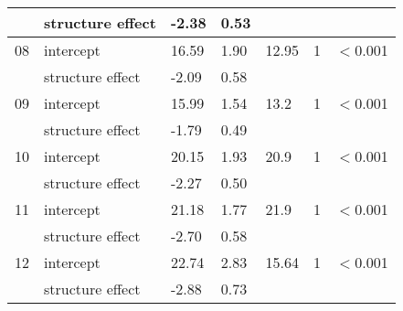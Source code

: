 \documentclass{article}
\begin{document}
\begin{table}[ht]
\begin{tabular}{|p{}|p{}|p{}p{}p{}p{}p{}|}
    & structure effect & -2.38 & 0.53 &  &  &  \\ 
   \hline
08 & intercept & 16.59 & 1.90 & 12.95 & 1 & $<$0.001 \\ 
    & structure effect & -2.09 & 0.58 &  &  &  \\ 
   \hline
09 & intercept & 15.99 & 1.54 & 13.2 & 1 & $<$0.001 \\ 
    & structure effect & -1.79 & 0.49 &  &  &  \\ 
   \hline
10 & intercept & 20.15 & 1.93 & 20.9 & 1 & $<$0.001 \\ 
    & structure effect & -2.27 & 0.50 &  &  &  \\ 
   \hline
11 & intercept & 21.18 & 1.77 & 21.9 & 1 & $<$0.001 \\ 
    & structure effect & -2.70 & 0.58 &  &  &  \\ 
   \hline
12 & intercept & 22.74 & 2.83 & 15.64 & 1 & $<$0.001 \\ 
    & structure effect & -2.88 & 0.73 &  &  &  \\ 
   \hline
\end{tabular}
\end{table}\clearpage
\end{document}
